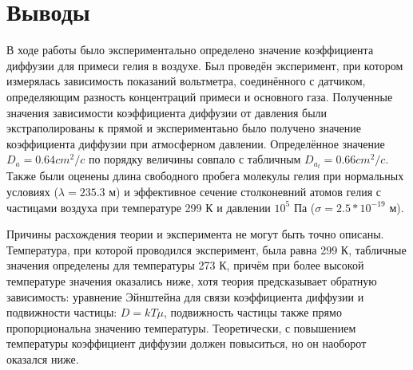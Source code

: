 \documentclass[12pt,a4paper]{article}
\begin{document}
\section{Выводы}
В ходе работы было экспериментально определено значение коэффициента диффузии для примеси гелия в воздухе. Был проведён эксперимент, при котором измерялась зависимость показаний вольтметра, соединённого с датчиком, определяющим разность концентраций примеси и основного газа. Полученные значения зависимости коэффициента диффузии от давления были экстраполированы к прямой и экспериментаьно было получено значение коэффициента диффузии при атмосферном давлении. Определённое значение $D_a = 0.64 cm^2/c$  по порядку величины совпало с табличным $D_{a_{t}} = 0.66 cm^2/c$. Также были оценены длина свободного пробега молекулы гелия при нормальных условиях ($\lambda =  235.3$ м) и эффективное сечение столконевний атомов гелия с частицами воздуха при температуре 299 К и давлении $10^5$ Па ($\sigma = 2.5 * 10^{-19}$ м).\par
Причины расхождения теории и эксперимента не могут быть точно описаны. Температура, при которой проводился эксперимент, была равна 299 К, табличные значения определены для температуры 273 К, причём при более высокой температуре значения оказались ниже, хотя теория предсказывает обратную зависимость: уравнение Эйнштейна для связи коэффициента диффузии и подвижности частицы: $D = kT\mu$, подвижность частицы также прямо пропорциональна значению температуры. Теоретически, с повышением температуры коэффициент диффузии должен повыситься, но он наоборот оказался ниже. \par
\end{document}
